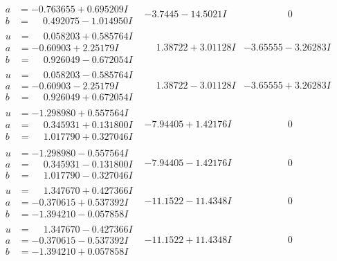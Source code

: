 \documentclass[1p]{elsarticle_modified}
\theoremstyle{definition}
\begin{document}
$$\begin{array}{c|c|c}
\begin{aligned}
a &= -0.763655 + 0.695209 I \\
b &= \phantom{-}0.492075 - 1.014950 I\end{aligned}
 & -3.7445 - 14.5021 I & \phantom{-0.000000 } 0 \\ \hline\begin{aligned}
u &= \phantom{-}0.058203 + 0.585764 I \\
a &= -0.60903 + 2.25179 I \\
b &= \phantom{-}0.926049 - 0.672054 I\end{aligned}
 & \phantom{-}1.38722 + 3.01128 I & -3.65555 - 3.26283 I \\ \hline\begin{aligned}
u &= \phantom{-}0.058203 - 0.585764 I \\
a &= -0.60903 - 2.25179 I \\
b &= \phantom{-}0.926049 + 0.672054 I\end{aligned}
 & \phantom{-}1.38722 - 3.01128 I & -3.65555 + 3.26283 I \\ \hline\begin{aligned}
u &= -1.298980 + 0.557564 I \\
a &= \phantom{-}0.345931 + 0.131800 I \\
b &= \phantom{-}1.017790 + 0.327046 I\end{aligned}
 & -7.94405 + 1.42176 I & \phantom{-0.000000 } 0 \\ \hline\begin{aligned}
u &= -1.298980 - 0.557564 I \\
a &= \phantom{-}0.345931 - 0.131800 I \\
b &= \phantom{-}1.017790 - 0.327046 I\end{aligned}
 & -7.94405 - 1.42176 I & \phantom{-0.000000 } 0 \\ \hline\begin{aligned}
u &= \phantom{-}1.347670 + 0.427366 I \\
a &= -0.370615 + 0.537392 I \\
b &= -1.394210 - 0.057858 I\end{aligned}
 & -11.1522 - 11.4348 I & \phantom{-0.000000 } 0 \\ \hline\begin{aligned}
u &= \phantom{-}1.347670 - 0.427366 I \\
a &= -0.370615 - 0.537392 I \\
b &= -1.394210 + 0.057858 I\end{aligned}
 & -11.1522 + 11.4348 I & \phantom{-0.000000 } 0 \\ \hline\begin{aligned}

\end{aligned}
\end{array}$$
\end{document}
